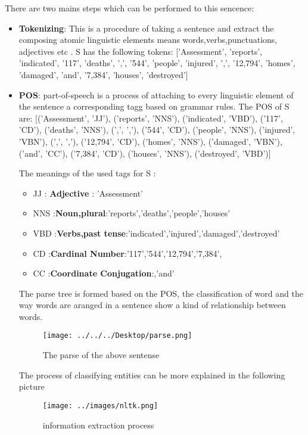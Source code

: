 There are two mains steps which can be performed to this sencence:
\begin{itemize}
\item \textbf{Tokenizing}: This is a procedure of taking a sentence and extract the composing atomic linguistic elements means words,verbs,punctuations, adjectives etc .
S has the following tokens: ['Assessment', 'reports', 'indicated', '117', 'deaths', ',', '544', 'people', 'injured', ',', '12,794', 'homes', 'damaged', 'and', '7,384', 'houses', 'destroyed']
\item \textbf{POS}: part-of-speech is a process of attaching to every linguistic element of the sentence a corresponding tagg based on grammar rules.
The POS of S  are: 
[('Assessment', 'JJ'), ('reports', 'NNS'), ('indicated', 'VBD'), ('117', 'CD'), ('deaths', 'NNS'), (',', ','), ('544', 'CD'), ('people', 'NNS'), ('injured', 'VBN'), (',', ','), ('12,794', 'CD'), ('homes', 'NNS'), ('damaged', 'VBN'), ('and', 'CC'), ('7,384', 'CD'), ('houses', 'NNS'), ('destroyed', 'VBD')]

The meanings of the used tags for S :

\begin{itemize}
\item JJ : \textbf{Adjective} :  'Assessment'   
\item NNS :\textbf{Noun,plural}:'reports','deaths','people','houses'
\item VBD :\textbf{Verbs,past tense}:'indicated','injured','damaged','destroyed'
\item CD :\textbf{Cardinal Number}:'117','544','12,794','7,384',
\item CC :\textbf{Coordinate Conjugation}:,'and'
\end{itemize}
The parse tree is formed based on the POS, the classification of word and the way words are aranged in a sentence show a kind of relationship between words.
\begin{figure}[hbtp]
\caption{The parse of the above sentense}
\centering
\texttt{[image: ../../../Desktop/parse.png]}
\end{figure}


The process of classifying entities can be more explained in the following picture

\begin{figure}[hbtp]
\caption{information extraction process}
\centering
\texttt{[image: ../images/nltk.png]}
\end{figure}
\end{itemize}


